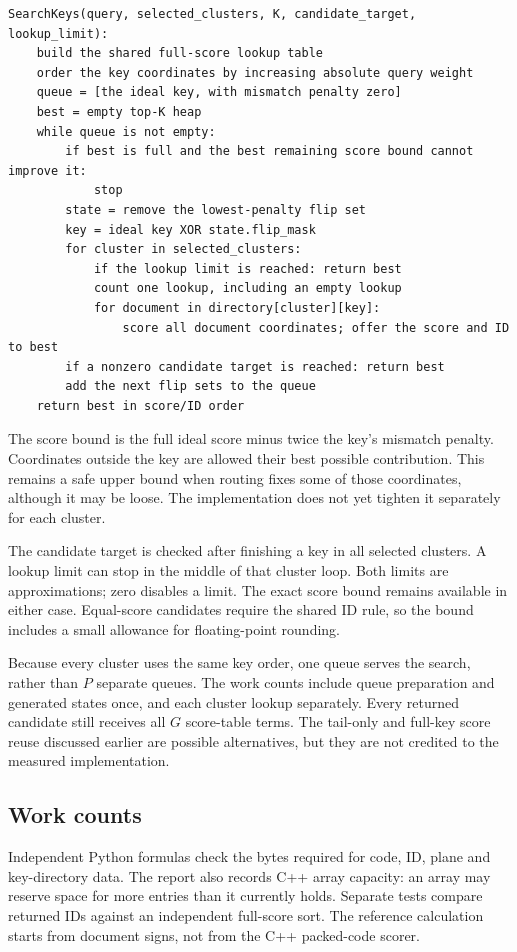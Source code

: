 \begin{lstlisting}[caption={The native key-search policy used in the measured study.}]
SearchKeys(query, selected_clusters, K, candidate_target, lookup_limit):
    build the shared full-score lookup table
    order the key coordinates by increasing absolute query weight
    queue = [the ideal key, with mismatch penalty zero]
    best = empty top-K heap
    while queue is not empty:
        if best is full and the best remaining score bound cannot improve it:
            stop
        state = remove the lowest-penalty flip set
        key = ideal key XOR state.flip_mask
        for cluster in selected_clusters:
            if the lookup limit is reached: return best
            count one lookup, including an empty lookup
            for document in directory[cluster][key]:
                score all document coordinates; offer the score and ID to best
        if a nonzero candidate target is reached: return best
        add the next flip sets to the queue
    return best in score/ID order
\end{lstlisting}
The score bound is the full ideal score minus twice the key's mismatch penalty. Coordinates
outside the key are allowed their best possible contribution. This remains a safe upper bound
when routing fixes some of those coordinates, although it may be loose. The implementation
does not yet tighten it separately for each cluster.

The candidate target is checked after finishing a key in all selected clusters. A lookup limit
can stop in the middle of that cluster loop. Both limits are approximations; zero disables a
limit. The exact score bound remains available in either case. Equal-score candidates require
the shared ID rule, so the bound includes a small allowance for floating-point rounding.

Because every cluster uses the same key order, one queue serves the search, rather than $P$
separate queues. The work counts include queue preparation and generated states once, and each cluster lookup separately. Every returned candidate still receives all
$G$ score-table terms. The tail-only and full-key score reuse discussed earlier are possible
alternatives, but they are not credited to the measured implementation.

\subsection{Work counts}
Independent Python formulas check the bytes required for code, ID, plane and key-directory data.
The report also records C++ array capacity: an array may reserve space for more entries than
it currently holds. Separate tests compare returned IDs against an independent full-score sort.
The reference calculation starts from document signs, not from the C++ packed-code scorer.

